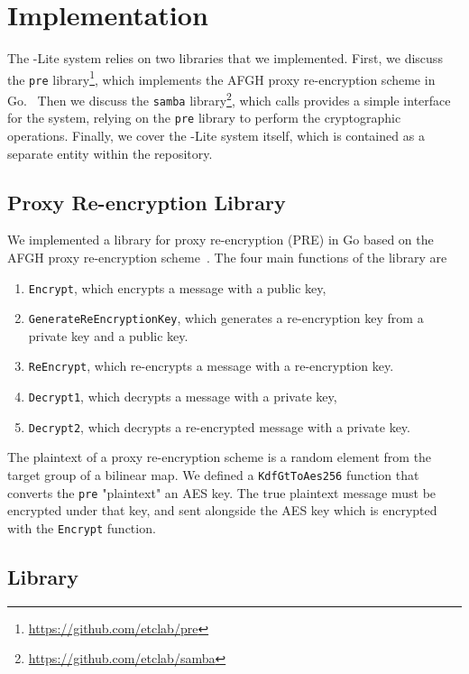 \section{Implementation}
\label{sec:implementation}

The \SystemName-Lite system relies on two libraries that we implemented. First, we discuss the \texttt{pre} library\footnote{\url{https://github.com/etclab/pre}},
which implements the AFGH proxy re-encryption scheme in Go.~\cite{05-ndss-improved_proxy_reencryption}
Then we discuss the \texttt{samba} library\footnote{\url{https://github.com/etclab/samba}}, which calls provides a simple interface for the \SystemName system, relying on the \texttt{pre} library to perform the cryptographic operations.
Finally, we cover the \SystemName-Lite system itself, which is contained as a separate entity within the \SystemName repository.

\subsection{Proxy Re-encryption Library}
\label{sec:PRE}
%
We implemented a library for proxy re-encryption (PRE) in Go based on the AFGH proxy re-encryption scheme~\cite{05-ndss-improved_proxy_reencryption}.
The four main functions of the library are 
\begin{enumerate}
	\item \texttt{Encrypt}, which encrypts a message with a public key,
	\item \texttt{GenerateReEncryptionKey}, which generates a re-encryption key from a private key and a public key.
	\item \texttt{ReEncrypt}, which re-encrypts a message with a re-encryption key.
	\item \texttt{Decrypt1}, which decrypts a message with a private key,
	\item \texttt{Decrypt2}, which decrypts a re-encrypted message with a private key.
\end{enumerate}

The plaintext of a proxy re-encryption scheme is a random element from the target group of a bilinear map.
We defined a \texttt{KdfGtToAes256} function that converts the \texttt{pre} "plaintext" an AES key.
The true plaintext message must be encrypted under that key, and sent alongside the AES key which is encrypted with the \texttt{Encrypt} function.

\subsection{\SystemName Library}

